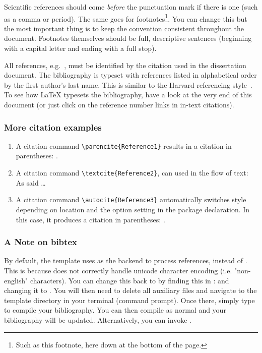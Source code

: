 Scientific references should come \emph{before} the punctuation mark if there is one (such as a comma or period). The same goes for footnotes\footnote{Such as this footnote, here down at the bottom of the page.}. You can change this but the most important thing is to keep the convention consistent throughout the document. Footnotes themselves should be full, descriptive sentences (beginning with a capital letter and ending with a full stop). 

All references, e.g.~\parencite{neville2010}, must be identified by the citation used in the dissertation document. The bibliography is typeset with references listed in alphabetical order by the first author's last name. This is similar to the Harvard referencing style~\parencite{york2010}. To see how \LaTeX{} typesets the bibliography, have a look at the very end of this document (or just click on the reference number links in in-text citations).

\subsubsection*{More citation examples}

\begin{enumerate} \item A citation command \verb!\parencite{Reference1}! results in a citation in parentheses: \parencite{Reference1}. 
\item A citation command \verb!\textcite{Reference2}!, can used in the flow of text: As \textcite{Reference2} said \dots 
\item A citation command \verb!\autocite{Reference3}! automatically switches style depending on location and the option setting in the package declaration. In this case, it produces a citation in parentheses: \autocite{Reference3}. \end{enumerate}

\subsubsection*{A Note on bibtex}

By default, the template uses  as the backend to process references, instead of . This is because  does not correctly handle unicode character encoding (i.e. "non-english" characters). You can change this back to   by finding this in :  and changing it to . You will then need to delete all auxiliary files and navigate to the template directory in your terminal (command prompt). Once there, simply type  to compile your bibliography. You can then compile  as normal and your bibliography will be updated. Alternatively, you can invoke .

